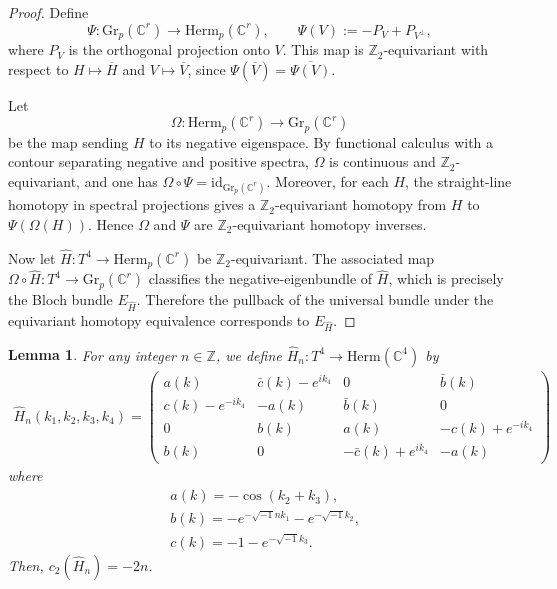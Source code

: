 \documentclass{amsart}
\newtheorem{lem}[thm]{Lemma}
\theoremstyle{definition}
\theoremstyle{remark}
\begin{document}
\begin{proof}
Define
\[
\Psi: \mathrm{Gr}_p(\mathbb{C}^r)\to \mathrm{Herm}_p(\mathbb{C}^r),
\qquad
\Psi(V):=-P_V+P_{V^\perp},
\]
where \(P_V\) is the orthogonal projection onto \(V\). This map is \(\mathbb{Z}_2\)-equivariant with respect to
\(H\mapsto \overline{H}\) and \(V\mapsto \overline{V}\), since
\(
\Psi(\overline{V})=\overline{\Psi(V)}
\).

Let
\[
\Omega: \mathrm{Herm}_p(\mathbb{C}^r)\to \mathrm{Gr}_p(\mathbb{C}^r)
\]
be the map sending \(H\) to its negative eigenspace. By functional calculus with a contour separating negative and positive spectra, \(\Omega\) is continuous and \(\mathbb{Z}_2\)-equivariant, and one has
\(
\Omega\circ \Psi=\mathrm{id}_{\mathrm{Gr}_p(\mathbb{C}^r)}
\).
Moreover, for each \(H\), the straight-line homotopy in spectral projections gives a \(\mathbb{Z}_2\)-equivariant homotopy from \(H\) to \(\Psi(\Omega(H))\). Hence \(\Omega\) and \(\Psi\) are \(\mathbb{Z}_2\)-equivariant homotopy inverses.

Now let \(\hat{H}:T^4\to \mathrm{Herm}_p(\mathbb{C}^r)\) be \(\mathbb{Z}_2\)-equivariant. The associated map
\(\Omega\circ \hat{H}:T^4\to \mathrm{Gr}_p(\mathbb{C}^r)\)
classifies the negative-eigenbundle of \(\hat{H}\), which is precisely the Bloch bundle \(E_{\hat{H}}\). Therefore the pullback of the universal bundle under the equivariant homotopy equivalence corresponds to \(E_{\hat{H}}\).
\end{proof}

\begin{lem}\label{lem:5.9}
For any integer $n \in \mathbb{Z}$, we define $\hat{H}_n : T^4 \to \text{Herm}(\mathbb{C}^4)$ by
\begin{align*}
\hat{H}_{n}(k_1, k_2, k_3, k_4)=\begin{pmatrix}
   a(k) & \bar{c}(k)-e^{ik_{4}} & 0 & \bar{b}(k) \\
   c(k)-e^{-ik_{4}} & -a(k) & \bar{b}(k) & 0 \\
   0 & b(k) & a(k) & -c(k)+e^{-ik_{4}} \\
   b(k) & 0 & -\bar{c}(k)+e^{ik_{4}} & -a(k)
\end{pmatrix}
\end{align*}
where 
\begin{align*}
&a(k)=-\cos(k_2+k_3), \\
&b(k)=-e^{-\sqrt{-1}nk_1}-e^{-\sqrt{-1}k_2}, \\
&c(k)=-1-e^{-\sqrt{-1}k_3}.
\end{align*}
Then, $c_2(\hat{H}_n)=-2n$.
\end{lem}
\end{document}
